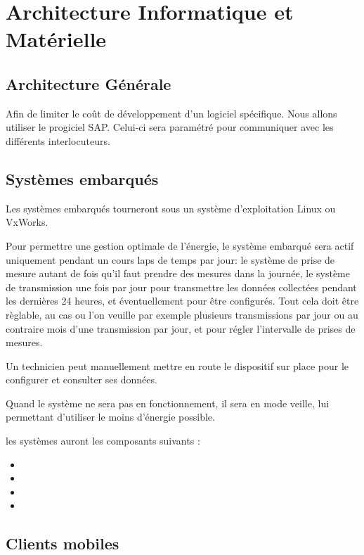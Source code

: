 \section{Architecture Informatique et Matérielle}

\subsection{Architecture Générale}
Afin de limiter le coût de développement d'un logiciel spécifique. 
Nous allons utiliser le progiciel SAP. Celui-ci sera paramétré pour
communiquer avec les différents interlocuteurs. 

\subsection{Systèmes embarqués}

Les systèmes embarqués tourneront sous un système d'exploitation Linux ou VxWorks. 

Pour permettre une gestion optimale de l'énergie, le système embarqué sera actif
uniquement pendant un cours laps de temps par jour: le système de prise de mesure
autant de fois qu'il faut prendre des mesures dans la journée, le système de
transmission une fois par jour pour transmettre les données collectées pendant
les dernières 24 heures, et éventuellement pour être configurés.
Tout cela doit être règlable, au cas ou l'on veuille par exemple plusieurs transmissions
par jour ou au contraire mois d'une transmission par jour, et pour régler l'intervalle de
prises de mesures.

Un technicien peut manuellement mettre en route le dispositif sur place pour
le configurer et consulter ses données.

Quand le système ne sera pas en fonctionnement, il sera en mode veille, lui
permettant d'utiliser le moins d'énergie possible.

les systèmes auront les composants suivants : 
\begin{itemize}
\item{}
\item{}
\item{}
\item{}
\end{itemize}



\subsection{Clients mobiles}

